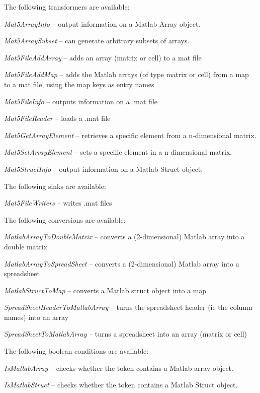 \documentclass[a4paper]{book}
\begin{document}
The following transformers are available:
\begin{tight_itemize}
  \item \textit{Mat5ArrayInfo} -- output information on a Matlab Array object.
  \item \textit{Mat5ArraySubset} -- can generate arbitrary subsets of arrays.
  \item \textit{Mat5FileAddArray} -- adds an array (matrix or cell) to a mat file
  \item \textit{Mat5FileAddMap} -- adds the Matlab arrays (of type matrix or cell) from a map to a mat file, using the map keys as entry names
  \item \textit{Mat5FileInfo} -- outputs information on a .mat file
  \item \textit{Mat5FileReader} -- loads a .mat file
  \item \textit{Mat5GetArrayElement} -- retrieves a specific element from a n-dimensional matrix.
  \item \textit{Mat5SetArrayElement} -- sets a specific element in a n-dimensional matrix.
  \item \textit{Mat5StructInfo} -- output information on a Matlab Struct object.
\end{tight_itemize}

The following sinks are available:
\begin{tight_itemize}
  \item \textit{Mat5FileWriters} -- writes .mat files
\end{tight_itemize}

The following conversions are available:
\begin{tight_itemize}
  \item \textit{MatlabArrayToDoubleMatrix} -- converts a (2-dimensional) Matlab array into a double matrix
  \item \textit{MatlabArrayToSpreadSheet} -- converts a (2-dimensional) Matlab array into a spreadsheet
  \item \textit{MatlabStructToMap} -- converts a Matlab struct object into a map
  \item \textit{SpreadSheetHeaderToMatlabArray} -- turns the spreadsheet header (ie the column names) into an array
  \item \textit{SpreadSheetToMatlabArray} -- turns a spreadsheet into an array (matrix or cell)
\end{tight_itemize}

The following boolean conditions are available:
\begin{tight_itemize}
  \item \textit{IsMatlabArray} -- checks whether the token contains a Matlab array object.
  \item \textit{IsMatlabStruct} -- checks whether the token contains a Matlab Struct object.
\end{tight_itemize}



\end{document}
